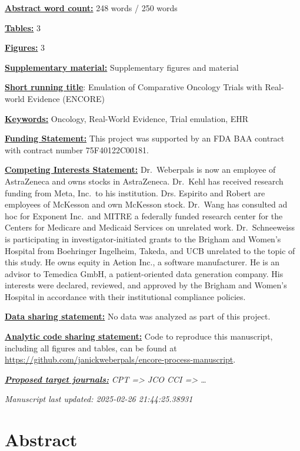\documentclass[
  letterpaper,
  DIV=11,
  numbers=noendperiod]{scrartcl}
\begin{document}
\ul{\textbf{Abstract word count:}} 248 words / 250 words

\ul{\textbf{Tables:}} 3

\ul{\textbf{Figures:}} 3

\ul{\textbf{Supplementary material:}} Supplementary figures and material

\ul{\textbf{Short running title}}: Emulation of Comparative Oncology
Trials with Real-world Evidence (ENCORE)

\ul{\textbf{Keywords:}} Oncology, Real-World Evidence, Trial emulation,
EHR

\ul{\textbf{Funding Statement:}} This project was supported by an FDA
BAA contract with contract number 75F40122C00181.

\ul{\textbf{Competing Interests Statement:}} Dr.~Weberpals is now an
employee of AstraZeneca and owns stocks in AstraZeneca. Dr.~Kehl has
received research funding from Meta, Inc.~to his institution. Drs.
Espirito and Robert are employees of McKesson and own McKesson stock.
Dr.~Wang has consulted ad hoc for Exponent Inc.~and MITRE a federally
funded research center for the Centers for Medicare and Medicaid
Services on unrelated work. Dr.~Schneeweiss is participating in
investigator-initiated grants to the Brigham and Women's Hospital from
Boehringer Ingelheim, Takeda, and UCB unrelated to the topic of this
study. He owns equity in Aetion Inc., a software manufacturer. He is an
advisor to Temedica GmbH, a patient-oriented data generation company.
His interests were declared, reviewed, and approved by the Brigham and
Women's Hospital in accordance with their institutional compliance
policies.

\ul{\textbf{Data sharing statement:}} No data was analyzed as part of
this project.

\ul{\textbf{Analytic code sharing statement:}} Code to reproduce this
manuscript, including all figures and tables, can be found at
\url{https://github.com/janickweberpals/encore-process-manuscript}.

\ul{\textbf{\emph{Proposed target journals:}}} \emph{CPT =\textgreater{}
JCO CCI =\textgreater{} \ldots{}}

\emph{Manuscript last updated: 2025-02-26 21:44:25.38931}

\newpage{}

\section*{Abstract}\label{abstract}
\end{document}
